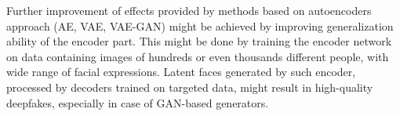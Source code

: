 Further improvement of effects provided by methods based on autoencoders approach (AE, VAE, VAE-GAN) might be achieved by improving generalization ability of the encoder part. This might be done by training the encoder network on data containing images of hundreds or even thousands different people, with wide range of facial expressions. Latent faces generated  by such encoder, processed by decoders trained on targeted data, might result in high-quality deepfakes, especially in case of GAN-based generators.